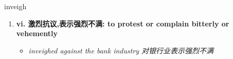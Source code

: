 
\begin{frame}
{\huge inveigh}
\begin{center}
\begin{enumerate}\Large
  \item \textbf{vi. 激烈抗议,表示强烈不满: to protest or complain bitterly or vehemently}
  \begin{itemize}
    \item \em{\Large{inveighed against the bank industry 对银行业表示强烈不满}}
  \end{itemize}
\end{enumerate}
\end{center}
\end{frame}
